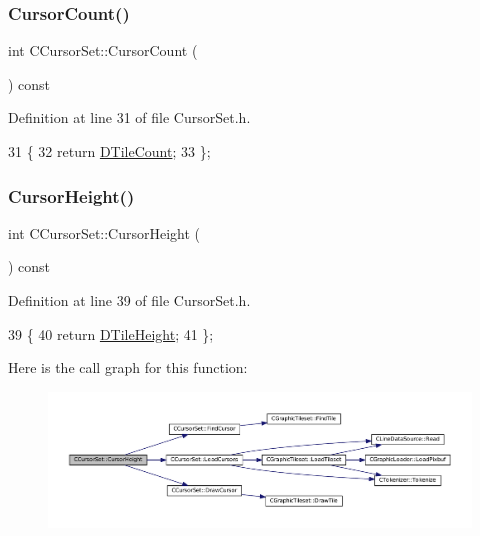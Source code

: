\subsubsection{\texorpdfstring{Cursor\+Count()}{CursorCount()}}
{\footnotesize\ttfamily int C\+Cursor\+Set\+::\+Cursor\+Count (\begin{DoxyParamCaption}{ }\end{DoxyParamCaption}) const\hspace{0.3cm}{\ttfamily [inline]}}



Definition at line 31 of file Cursor\+Set.\+h.


\begin{DoxyCode}
31                                \{
32             \textcolor{keywordflow}{return} \hyperlink{classCGraphicTileset_a39d942b370e47f441bf97385eb1037c8}{DTileCount};
33         \};
\end{DoxyCode}
\hypertarget{classCCursorSet_a25ce1f3e861c3d4ea701bb2e810728a6}{}\label{classCCursorSet_a25ce1f3e861c3d4ea701bb2e810728a6} 
\subsubsection{\texorpdfstring{Cursor\+Height()}{CursorHeight()}}
{\footnotesize\ttfamily int C\+Cursor\+Set\+::\+Cursor\+Height (\begin{DoxyParamCaption}{ }\end{DoxyParamCaption}) const\hspace{0.3cm}{\ttfamily [inline]}}



Definition at line 39 of file Cursor\+Set.\+h.


\begin{DoxyCode}
39                                 \{
40             \textcolor{keywordflow}{return} \hyperlink{classCGraphicTileset_af48f32e07d5fe69afd5f764318cc3244}{DTileHeight};
41         \};
\end{DoxyCode}
Here is the call graph for this function\+:
\nopagebreak
\begin{figure}[H]
\begin{center}
\leavevmode
\includegraphics[width=350pt]{classCCursorSet_a25ce1f3e861c3d4ea701bb2e810728a6_cgraph}
\end{center}
\end{figure}
\hypertarget{classCCursorSet_a6984a5bfd8b989c09f9ab8aac459993e}{}\label{classCCursorSet_a6984a5bfd8b989c09f9ab8aac459993e} 
